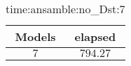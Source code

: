 \begin{table}[!ht]
	\centering
	\begin{tabular}{|c|c|}
		\hline
		Models & elapsed \\ \hline
		$7$ & $794.27$ \\ \hline
	\end{tabular}
	\caption{time:ansamble:no_Dst:7}
	\label{tab:time:ansamble:no_Dst:7}
\end{table}
